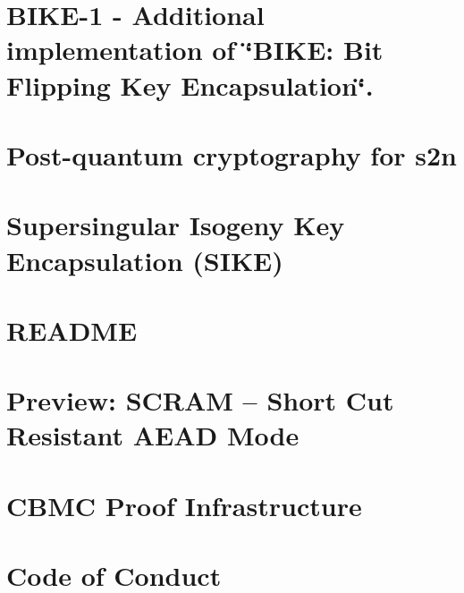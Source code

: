 \documentclass[twoside]{book}
\newcommand{\+}{\discretionary{\mbox{\scriptsize$\hookleftarrow$}}{}{}}
\begin{document}
\chapter{BIKE-\/1 -\/ Additional implementation of \char`\"{}\+BIKE\+: Bit Flipping Key Encapsulation\char`\"{}.}
\label{md_crt_aws_crt_cpp_crt_s2n_pq_crypto_bike_r2__r_e_a_d_m_e}

\chapter{Post-\/quantum cryptography for s2n}
\label{md_crt_aws_crt_cpp_crt_s2n_pq_crypto__r_e_a_d_m_e}

\chapter{Supersingular Isogeny Key Encapsulation (SIKE)}
\label{md_crt_aws_crt_cpp_crt_s2n_pq_crypto_sike_r1__readme}

\chapter{README}
\label{md_crt_aws_crt_cpp_crt_s2n__r_e_a_d_m_e}

\chapter{Preview\+: SCRAM -- Short Cut Resistant AEAD Mode}
\label{md_crt_aws_crt_cpp_crt_s2n_scram__r_e_a_d_m_e}

\chapter{CBMC Proof Infrastructure}
\label{md_crt_aws_crt_cpp_crt_s2n_tests_cbmc__r_e_a_d_m_e}

\chapter{Code of Conduct}
\label{md_crt_aws_crt_cpp_crt_s2n_tests_cbmc_templates__c_o_d_e__o_f__c_o_n_d_u_c_t}

\end{document}
